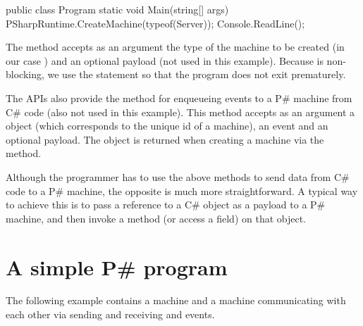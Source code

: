 \documentclass{llncs}
\newcommand{\ps}{P\#\xspace}
\newcommand{\cs}{C\#\xspace}
\begin{document}
\begin{psharpNoLines}
public class Program {
  static void Main(string[] args) {
    PSharpRuntime.CreateMachine(typeof(Server));
    Console.ReadLine();
  }
}
\end{psharpNoLines}

\noindent
The  method accepts as an argument the type of the machine to be created (in our case ) and an optional payload (not used in this example). Because  is non-blocking, we use the  statement so that the program does not exit prematurely.

The  APIs also provide the  method for enqueueing events to a \ps machine from \cs code (also not used in this example). This method accepts as an argument a  object (which corresponds to the unique id of a machine), an event and an optional payload. The  object is returned when creating a machine via the  method.

Although the programmer has to use the above methods to send data from \cs code to a \ps machine, the opposite is much more straightforward. A typical way to achieve this is to pass a reference to a \cs object as a payload to a \ps machine, and then invoke a method (or access a field) on that object.


\section{A simple \ps program}
\label{sec:simple}

The following example contains a  machine and a  machine communicating with each other via sending and receiving  and  events.\\
\end{document}
